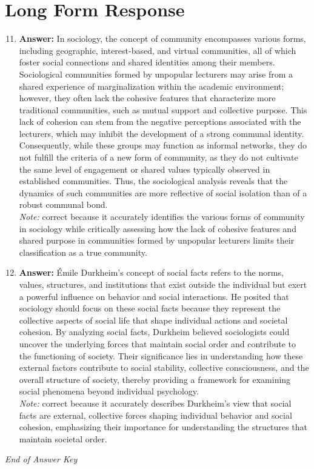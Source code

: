 \documentclass[12pt]{article}
\begin{document}
\section*{Long Form Response}
\begin{enumerate}[label=\arabic*.]
\setcounter{enumi}{10}
\item \textbf{Answer:} In sociology, the concept of community encompasses various forms, including geographic, interest-based, and virtual communities, all of which foster social connections and shared identities among their members. Sociological communities formed by unpopular lecturers may arise from a shared experience of marginalization within the academic environment; however, they often lack the cohesive features that characterize more traditional communities, such as mutual support and collective purpose. This lack of cohesion can stem from the negative perceptions associated with the lecturers, which may inhibit the development of a strong communal identity. Consequently, while these groups may function as informal networks, they do not fulfill the criteria of a new form of community, as they do not cultivate the same level of engagement or shared values typically observed in established communities. Thus, the sociological analysis reveals that the dynamics of such communities are more reflective of social isolation than of a robust communal bond.
\\ \textit{Note:} correct because it accurately identifies the various forms of community in sociology while critically assessing how the lack of cohesive features and shared purpose in communities formed by unpopular lecturers limits their classification as a true community.
\item \textbf{Answer:} Émile Durkheim's concept of social facts refers to the norms, values, structures, and institutions that exist outside the individual but exert a powerful influence on behavior and social interactions. He posited that sociology should focus on these social facts because they represent the collective aspects of social life that shape individual actions and societal cohesion. By analyzing social facts, Durkheim believed sociologists could uncover the underlying forces that maintain social order and contribute to the functioning of society. Their significance lies in understanding how these external factors contribute to social stability, collective consciousness, and the overall structure of society, thereby providing a framework for examining social phenomena beyond individual psychology.
\\ \textit{Note:} correct because it accurately describes Durkheim's view that social facts are external, collective forces shaping individual behavior and social cohesion, emphasizing their importance for understanding the structures that maintain societal order.
\end{enumerate}

\vfill
\noindent\textit{End of Answer Key}
\end{document}
